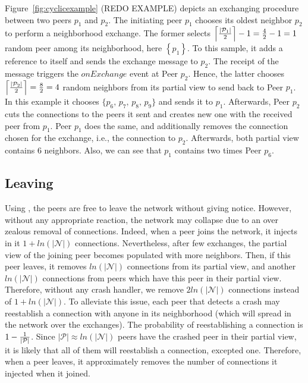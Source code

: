 Figure~\ref{fig:cyclicexample} (REDO EXAMPLE) depicts an exchanging procedure
between two peers $p_1$ and $p_2$. The initiating peer $p_1$ chooses its oldest
neighbor $p_2$ to perform a neighborhood exchange. The former selects
$\left\lceil{|\mathcal{P}_1|\over{2}}\right\rceil-1={4\over{2}}-1=1$ random
peer among its neighborhood, here $\left\{p_1\right\}$. To this sample, it adds
a reference to itself and sends the exchange message to $p_2$. The receipt of
the message triggers the $onExchange$ event at Peer $p_2$. Hence, the latter
chooses $\left\lceil{|\mathcal{P}_2|\over{2}}\right\rceil= {8\over{2}}=4$
random neighbors from its partial view to send back to Peer $p_1$. In this
example it chooses $\{p_6,\,p_7,\,p_8,\,p_9\}$ and sends it to
$p_1$. Afterwards, Peer $p_2$ cuts the connections to the peers it sent and
creates new one with the received peer from $p_1$. Peer $p_1$ does the same,
and additionally removes the connection chosen for the exchange, i.e., the
connection to $p_2$. Afterwards, both partial view contains $6$
neighbors. Also, we can see that $p_1$ contains two times Peer $p_6$.

\subsection{Leaving}
\label{subsec:leaving}

Using \SCAMPLON{}, the peers are free to leave the network without giving
notice. However, without any appropriate reaction, the network may collapse due
to an over zealous removal of connections. Indeed, when a peer joins the
network, it injects in it $1+ln(|\mathcal{N}|)$ connections. Nevertheless,
after few exchanges, the partial view of the joining peer becomes populated
with more neighbors. Then, if this peer leaves, it removes $ln(|\mathcal{N}|)$
connections from its partial view, and another $ln(|\mathcal{N}|)$ connections
from peers which have this peer in their partial view. Therefore, without any
crash handler, we remove $2ln(|\mathcal{N}|)$ connections instead of
$1+ln(|\mathcal{N}|)$. To alleviate this issue, each peer that detects a crash
may reestablish a connection with anyone in its neighborhood (which will
spread in the network over the exchanges). The probability of reestablishing a
connection is $1-{1\over{|\mathcal{P}|}}$. Since
${|\mathcal{P}|}\approx ln(|\mathcal{N}|)$ peers have the crashed peer in their
partial view, it is likely that all of them will reestablish a connection,
excepted one. Therefore, when a peer leaves, it approximately removes the
number of connections it injected when it joined.

